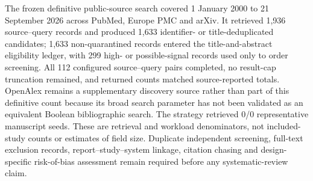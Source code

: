 The frozen definitive public-source search covered 1 January 2000 to 21 September 2026 across PubMed, Europe PMC and arXiv. It retrieved 1,936 source--query records and produced 1,633 identifier- or title-deduplicated candidates; 1,633 non-quarantined records entered the title-and-abstract eligibility ledger, with 299 high- or possible-signal records used only to order screening. All 112 configured source--query pairs completed, no result-cap truncation remained, and returned counts matched source-reported totals. OpenAlex remains a supplementary discovery source rather than part of this definitive count because its broad search parameter has not been validated as an equivalent Boolean bibliographic search. The strategy retrieved 0/0 representative manuscript seeds. These are retrieval and workload denominators, not included-study counts or estimates of field size. Duplicate independent screening, full-text exclusion records, report--study--system linkage, citation chasing and design-specific risk-of-bias assessment remain required before any systematic-review claim.
